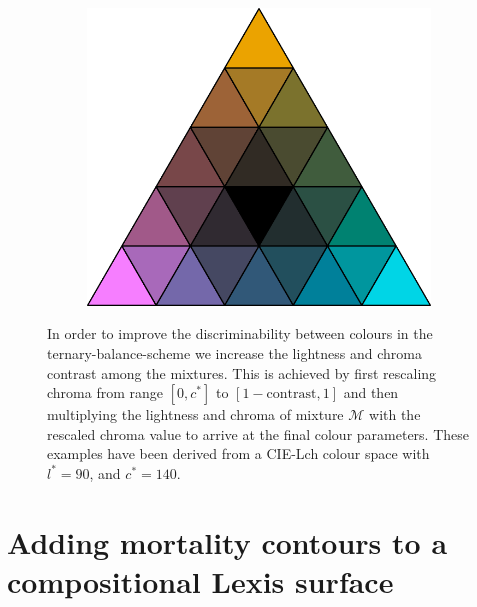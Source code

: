 \documentclass[parskip=half]{scrartcl}
\begin{document}
\begin{appendix}
\begin{figure}[!htb]
\begin{subfigure}[t]{0.3\textwidth}
  \label{fig:contrast0-5}
  \end{subfigure}%
  ~
  \begin{subfigure}[t]{0.3\textwidth}
  \includegraphics[width = \textwidth]{./fig/contrast1.pdf}
  \label{fig:contrast1}
  \end{subfigure}
  \caption{In order to improve the discriminability between colours in the ternary-balance-scheme we increase the lightness and chroma contrast among the mixtures. This is achieved by first rescaling chroma from range $[0, c^*]$ to $[1-\text{contrast}, 1]$ and then multiplying the lightness and chroma of mixture $\mathscr{M}$ with the rescaled chroma value to arrive at the final colour parameters. These examples have been derived from a CIE-Lch colour space with $l^*=90$, and $c^*=140$.}
  \label{fig:contrast}
\end{figure}

\clearpage

\section{Adding mortality contours to a compositional Lexis surface} %

\setcounter{figure}{0}


\end{appendix}
\end{document}
